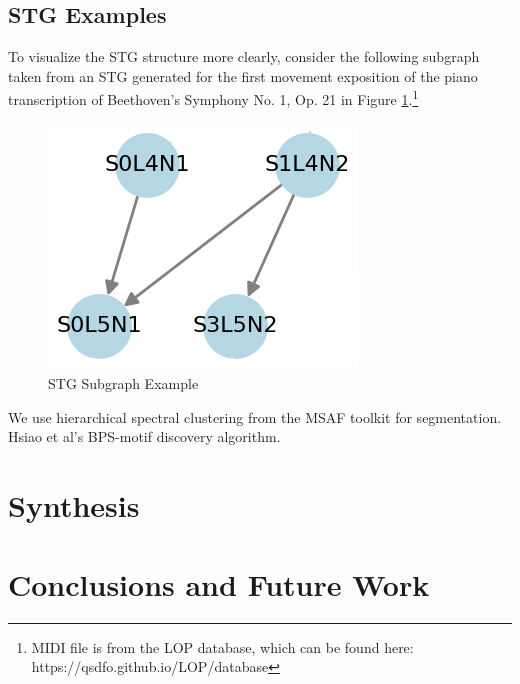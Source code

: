 \documentclass{article}
\begin{document}
\subsection{STG Examples}\label{subsec:stg_ex}

To visualize the STG structure more clearly, consider the following subgraph taken from an STG generated for the first movement exposition of the piano transcription of Beethoven's Symphony No. 1, Op. 21 in Figure \ref{fig:stg_ex}.\footnote{MIDI file is from the LOP database, which can be found here: https://qsdfo.github.io/LOP/database}

\begin{figure}[h]
  \centering
  \includegraphics[width=0.45\linewidth]{figs/stg_example}
  \caption{STG Subgraph Example}
  \label{fig:stg_ex}
\end{figure}


We use hierarchical spectral clustering from the MSAF toolkit for segmentation. Hsiao et al's BPS-motif discovery algorithm.

\section{Synthesis} \label{sec:synthesis}


\section{Conclusions and Future Work}


\end{document}
